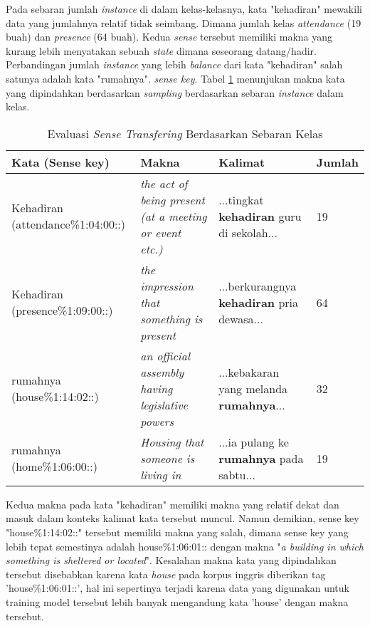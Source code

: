 Pada sebaran jumlah \textit{instance} di dalam kelas-kelasnya, kata "kehadiran" mewakili data yang jumlahnya relatif tidak seimbang. Dimana jumlah kelas \textit{attendance} (19 buah) dan \textit{presence} (64 buah). Kedua \textit{sense} tersebut memiliki makna yang kurang lebih menyatakan sebuah \textit{state} dimana seseorang datang/hadir. Perbandingan jumlah \textit{instance} yang lebih \textit{balance} dari kata "kehadiran" salah satunya adalah kata "rumahnya". \textit{sense key}. Tabel \ref{table:class-instance-sense-transfering-evaluation} menunjukan makna kata yang dipindahkan berdasarkan \textit{sampling} berdasarkan sebaran \textit{instance} dalam kelas.

\begin{table}
	\centering
	\caption{Evaluasi \textit{Sense Transfering} Berdasarkan Sebaran Kelas}
	\label{table:class-instance-sense-transfering-evaluation}
	\begin{tabular}{|p{4cm}|p{2.85cm}|p{2.85cm}|p{1.2cm}|}
		\hline
		Kata (Sense key) & Makna & Kalimat & Jumlah
		\\ \hline
		Kehadiran (attendance\%1:04:00::)  & 
		\textit{the act of being present (at a meeting or event etc.)}   & 
		...tingkat \textbf{kehadiran} guru di sekolah... &
		19
		\\ \hline
		Kehadiran (presence\%1:09:00::) & 
		\textit{the impression that something is present}   & 
		...berkurangnya \textbf{kehadiran} pria dewasa...
		&
		64
		\\ \hline
		rumahnya (house\%1:14:02::) & 
		\textit{an official assembly having legislative powers} & 
		...kebakaran yang melanda \textbf{rumahnya}...
		& 32
		\\ \hline
		rumahnya (home\%1:06:00::) &
		\textit{Housing that someone is living in} &
		...ia pulang ke \textbf{rumahnya} pada sabtu...
		& 19
		\\ \hline
	\end{tabular}
\end{table}

Kedua makna pada kata "kehadiran" memiliki makna yang relatif dekat dan masuk dalam konteks kalimat kata tersebut muncul. Namun demikian, sense key "house\%1:14:02::" tersebut memiliki makna yang salah, dimana sense key yang lebih tepat semestinya adalah house\%1:06:01:: dengan makna "\textit{a building in which something is sheltered or located}". Kesalahan makna kata yang dipindahkan tersebut disebabkan karena kata \textit{house} pada korpus inggris diberikan tag 'house\%1:06:01::', hal ini sepertinya terjadi karena data yang digunakan untuk training model tersebut lebih banyak mengandung kata 'house' dengan makna tersebut.

